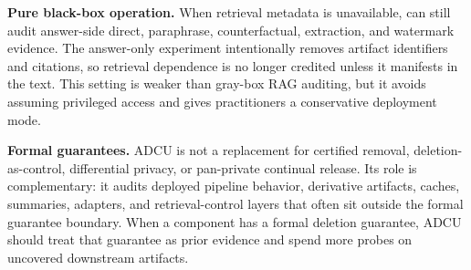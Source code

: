 \textbf{Pure black-box operation.}
When retrieval metadata is unavailable, \method{} can still audit answer-side direct, paraphrase, counterfactual, extraction, and watermark evidence. The answer-only experiment intentionally removes artifact identifiers and citations, so retrieval dependence is no longer credited unless it manifests in the text. This setting is weaker than gray-box RAG auditing, but it avoids assuming privileged access and gives practitioners a conservative deployment mode.

\textbf{Formal guarantees.}
ADCU is not a replacement for certified removal, deletion-as-control, differential privacy, or pan-private continual release. Its role is complementary: it audits deployed pipeline behavior, derivative artifacts, caches, summaries, adapters, and retrieval-control layers that often sit outside the formal guarantee boundary. When a component has a formal deletion guarantee, ADCU should treat that guarantee as prior evidence and spend more probes on uncovered downstream artifacts.
